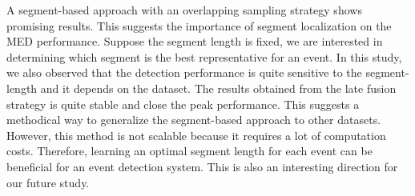 A segment-based approach with an overlapping sampling strategy shows promising results. This suggests the importance of segment localization on the MED performance. Suppose the segment length is fixed, we are interested in determining which segment is the best representative for an event. In this study, we also observed that the detection performance is quite sensitive to the segment-length and it depends on the dataset. The results obtained from the late fusion strategy is quite stable and close the peak performance. This suggests a methodical way to generalize the segment-based approach to other datasets. However, this method is not scalable because it requires a lot of computation costs. Therefore, learning an optimal segment length for each event can be beneficial for an event detection system. This is also an interesting direction for our future study.

